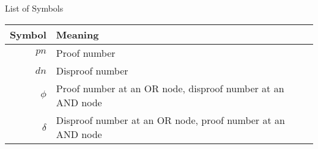 \documentclass[12pt, letterpaper]{report}
\numberwithin{equation}{section}
\begin{document}
  \setcounter{page}{-99}  %
  \thispagestyle{empty}
  

%  
  
  \newpage
  \normalsize
  \tableofcontents 
  
  \newpage
  \listoffigures

  \newpage  
  \listoftables
  
  \newpage
  \thispagestyle{empty}
  \section*{}
  \begin{flushright}
    \huge{List of Symbols}
  \end{flushright}
  \vspace{0.4in}
  \begin{center}
    \begin{tabular}{rl}
      Symbol & Meaning\\
      \hline
      $pn$           & Proof number \\
      $dn$           & Disproof number \\
      $\phi$         & Proof number at an OR node, disproof number at an AND node \\
      $\delta$       & Disproof number at an OR node, proof number at an AND node \\
    \end{tabular}
  \end{center}
  
  \newpage
  \thispagestyle{empty}
\end{document}
